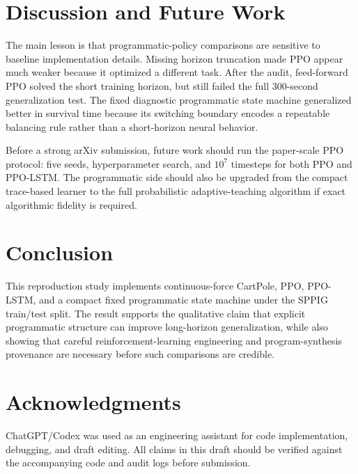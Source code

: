 \documentclass[letterpaper,twocolumn,10pt]{article}
\begin{document}
\section{Discussion and Future Work}

The main lesson is that programmatic-policy comparisons are sensitive to
baseline implementation details.  Missing horizon truncation made PPO appear
much weaker because it optimized a different task.  After the audit,
feed-forward PPO solved the short training horizon, but still failed the full
300-second generalization test.  The fixed diagnostic programmatic state
machine generalized better in survival time because its switching boundary
encodes a repeatable balancing rule rather than a short-horizon neural behavior.

Before a strong arXiv submission, future work should run the paper-scale PPO
protocol: five seeds, hyperparameter search, and $10^7$ timesteps for both PPO
and PPO-LSTM.  The programmatic side should also be upgraded from the compact
trace-based learner to the full probabilistic adaptive-teaching algorithm if
exact algorithmic fidelity is required.

\section{Conclusion}

This reproduction study implements continuous-force CartPole, PPO, PPO-LSTM,
and a compact fixed programmatic state machine under the SPPIG train/test split.
The result supports the qualitative claim that explicit programmatic structure
can improve long-horizon generalization, while also showing that careful
reinforcement-learning engineering and program-synthesis provenance are
necessary before such comparisons are credible.

\section*{Acknowledgments}

ChatGPT/Codex was used as an engineering assistant for code implementation,
debugging, and draft editing.  All claims in this draft should be verified
against the accompanying code and audit logs before submission.



\end{document}
